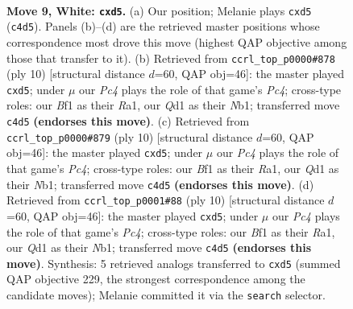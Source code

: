\documentclass[11pt]{article}
\begin{document}
\clearpage

\begin{figure}[p]\centering
\begin{subfigure}{0.46\textwidth}\centering
\resizebox{\linewidth}{!}{%
\newchessgame
\chessboard[
  setfen={r1b1k2r/ppp1qpp1/2n1pn2/3p3p/2PP4/2B2NP1/PP1KPP1P/R2Q1B1R w kq - 0 9},
  showmover=false,
  pgfstyle=straightmove, color=movearrow, markmove={c4-d5}
]}
\caption{}
\end{subfigure}\hfill
\begin{subfigure}{0.46\textwidth}\centering
\resizebox{\linewidth}{!}{%
\newchessgame
\chessboard[
  setfen={rnbqk2r/pp2ppbp/2p2np1/3p4/2PP4/5NP1/PP2PPBP/RNBQK2R w KQkq - 2 6},
  showmover=false,
  pgfstyle=straightmove, color=movearrow, markmove={c4-d5}
]}
\caption{}
\end{subfigure}
\\[4pt]
\begin{subfigure}{0.46\textwidth}\centering
\resizebox{\linewidth}{!}{%
\newchessgame
\chessboard[
  setfen={rnbqk2r/pp2ppbp/2p2np1/3p4/2PP4/5NP1/PP2PPBP/RNBQK2R w KQkq - 2 6},
  showmover=false,
  pgfstyle=straightmove, color=movearrow, markmove={c4-d5}
]}
\caption{}
\end{subfigure}\hfill
\begin{subfigure}{0.46\textwidth}\centering
\resizebox{\linewidth}{!}{%
\newchessgame
\chessboard[
  setfen={rnbqk2r/pp2ppbp/2p2np1/3p4/2PP4/5NP1/PP2PPBP/RNBQK2R w KQkq - 1 6},
  showmover=false,
  pgfstyle=straightmove, color=movearrow, markmove={c4-d5}
]}
\caption{}
\end{subfigure}
\caption{\textbf{Move 9, White: \texttt{cxd5}.} (a) Our position; Melanie plays \texttt{cxd5} (\texttt{c4d5}). Panels (b)--(d) are the retrieved master positions whose correspondence most drove this move (highest QAP objective among those that transfer to it). (b) Retrieved from \texttt{ccrl\_top\_p0000\#878} (ply 10) [structural distance $d$=60, QAP obj=46]: the master played \texttt{cxd5}; under $\mu$ our \emph{Pc4} plays the role of that game's \emph{Pc4}; cross-type roles: our \emph{B}f1 as their \emph{R}a1, our \emph{Q}d1 as their \emph{N}b1; transferred move \texttt{c4d5} \textbf{(endorses this move)}. (c) Retrieved from \texttt{ccrl\_top\_p0000\#879} (ply 10) [structural distance $d$=60, QAP obj=46]: the master played \texttt{cxd5}; under $\mu$ our \emph{Pc4} plays the role of that game's \emph{Pc4}; cross-type roles: our \emph{B}f1 as their \emph{R}a1, our \emph{Q}d1 as their \emph{N}b1; transferred move \texttt{c4d5} \textbf{(endorses this move)}. (d) Retrieved from \texttt{ccrl\_top\_p0001\#88} (ply 10) [structural distance $d$=60, QAP obj=46]: the master played \texttt{cxd5}; under $\mu$ our \emph{Pc4} plays the role of that game's \emph{Pc4}; cross-type roles: our \emph{B}f1 as their \emph{R}a1, our \emph{Q}d1 as their \emph{N}b1; transferred move \texttt{c4d5} \textbf{(endorses this move)}. Synthesis: 5 retrieved analogs transferred to \texttt{cxd5} (summed QAP objective 229, the strongest correspondence among the candidate moves); Melanie committed it via the \texttt{search} selector.}
\label{fig:thought-m16}
\end{figure}
\end{document}
